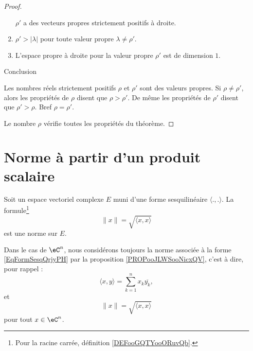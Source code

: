 \begin{proof}
\begin{enumerate}
		      \( \rho'\) a des vecteurs propres strictement positifs à droite.
		\item
		      \( \rho'>| \lambda |\) pour toute valeur propre \( \lambda\neq \rho'\).
		\item
		      L'espace propre à droite pour la valeur propre \( \rho'\) est de dimension \( 1\).
	\end{enumerate}
	\begin{center}
		Conclusion
	\end{center}
	Les nombres réels strictement positifs \( \rho\) et \( \rho'\) sont des valeurs propres. Si \( \rho\neq \rho'\), alors les propriétés de \( \rho\) disent que \( \rho>\rho'\). De même les propriétés de \( \rho'\) disent que \( \rho'>\rho\). Bref \( \rho=\rho'\).

	Le nombre \( \rho\) vérifie toutes les propriétés du théorème.
\end{proof}

\section{Norme à partir d'un produit scalaire}

\begin{proposition}            \label{PROPooJLWSooNicxQV}
	Soit un espace vectoriel complexe \( E\) muni d'une forme sesquilinéaire \( \langle ., .\rangle \). La formule\footnote{Pour la racine carrée, définition \ref{DEFooGQTYooORuvQb}.}
	\begin{equation}        \label{EQooZIXRooMGcsXY}
		\| x \|=  \sqrt{ \langle x, x\rangle }
	\end{equation}
	est une norme sur \( E\).
\end{proposition}

\begin{definition}      \label{DEFooGUXNooXwCsrq}
	Dans le cas de \( \eC^n\), nous considérons toujours la norme associée à la forme \eqref{EqFormSesqQrjyPH} par la proposition \ref{PROPooJLWSooNicxQV}, c'est à dire, pour rappel :
	\begin{equation}
		\langle x, y\rangle =\sum_{k=1}^nx_k\overline {y_k},
	\end{equation}
	et
	\begin{equation}
		\| x \|=  \sqrt{ \langle x, x\rangle }
	\end{equation}
	pour tout \( x\in \eC^n\).
\end{definition}

